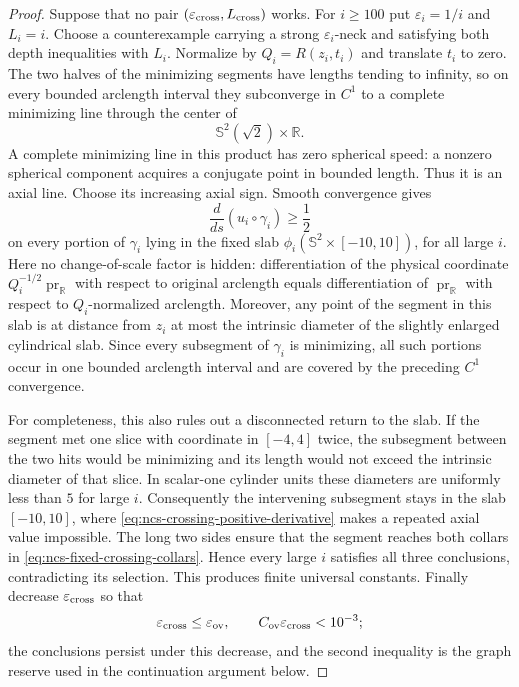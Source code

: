 \documentclass[10pt]{coll-l}
\newcommand{\Sph}{\mathbb{S}}
\theoremstyle{definition}
\theoremstyle{remark}
\numberwithin{section}{chapter}
\numberwithin{equation}{chapter}
\begin{document}
\begin{proof}
Suppose that no pair $(\varepsilon_{\rm cross},L_{\rm cross})$ works.
For $i\geq100$ put $\varepsilon_i=1/i$ and $L_i=i$.  Choose a
counterexample carrying a strong $\varepsilon_i$-neck and satisfying both
depth inequalities with $L_i$.  Normalize by $Q_i=R(z_i,t_i)$ and
translate $t_i$ to zero.  The two halves of the minimizing segments have
lengths tending to infinity, so on every bounded arclength interval they
subconverge in $C^1$ to a complete minimizing line through the center of
\begin{equation}
                       \Sph^2(\sqrt2)\times\mathbb R.          \label{eq:ncs-crossing-limit-cylinder}
\end{equation}
A complete minimizing line in this product has zero spherical speed: a
nonzero spherical component acquires a conjugate point in bounded length.
Thus it is an axial line.  Choose its increasing axial sign.  Smooth
convergence gives
\begin{equation}
                 \frac{d}{ds}(u_i\circ\gamma_i)\geq\frac12    \label{eq:ncs-crossing-positive-derivative}
\end{equation}
on every portion of $\gamma_i$ lying in the fixed slab
$\phi_i(\Sph^2\times[-10,10])$, for all large $i$.
Here no change-of-scale factor is hidden: differentiation of the physical
coordinate $Q_i^{-1/2}\operatorname{pr}_{\mathbb R}$ with respect to
original arclength equals differentiation of
$\operatorname{pr}_{\mathbb R}$ with respect to $Q_i$-normalized
arclength.  Moreover, any point of the segment in this slab is at distance
from $z_i$ at most the intrinsic diameter of the slightly enlarged
cylindrical slab.  Since every subsegment of $\gamma_i$ is minimizing,
all such portions occur in one bounded arclength interval and are covered
by the preceding $C^1$ convergence.

For completeness, this also rules out a disconnected return to the slab.
If the segment met one slice with coordinate in $[-4,4]$ twice, the
subsegment between the two hits would be minimizing and its length would
not exceed the intrinsic diameter of that slice.  In scalar-one cylinder
units these diameters are uniformly less than $5$ for large $i$.
Consequently the intervening subsegment stays in the slab $[-10,10]$,
where \eqref{eq:ncs-crossing-positive-derivative} makes a repeated axial
value impossible.  The long two sides ensure that the segment reaches
both collars in \eqref{eq:ncs-fixed-crossing-collars}.  Hence every large
$i$ satisfies all three conclusions, contradicting its selection.  This
produces finite universal constants.  Finally decrease
$\varepsilon_{\rm cross}$ so that
\begin{equation}
 \varepsilon_{\rm cross}\leq\varepsilon_{\rm ov},
 \qquad C_{\rm ov}\varepsilon_{\rm cross}<10^{-3};   \label{eq:ncs-crossing-overlap-reserve}
\end{equation}
the conclusions persist under this decrease, and the second inequality
is the graph reserve used in the continuation argument below.
\end{proof}
\end{document}
